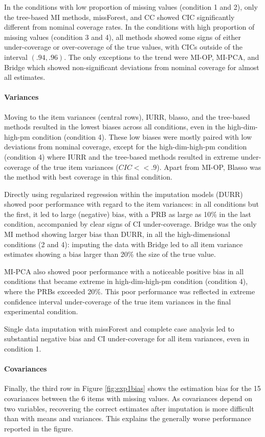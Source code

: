 \documentclass[]{./cls/interact}
\theoremstyle{plain}
\theoremstyle{definition}
\theoremstyle{remark}
\begin{document}
	In the conditions with low proportion of missing values (condition 1 and 2), only the tree-based MI methods,
	missForest, and CC showed CIC significantly different from nominal coverage rates.
	In the conditions with high proportion of missing values (condition 3 and 4), all methods showed some signs 
	of either under-coverage or over-coverage of the true values, with CICs outside of the interval $(.94, .96)$.
	The only exceptions to the trend were MI-OP, MI-PCA, and Bridge which showed non-significant deviations from 
	nominal coverage for almost all estimates.

	\paragraph{Variances} 
	Moving to the item variances (central rows), IURR, blasso, and the tree-based methods resulted in the lowest
	biases across all conditions, even in the high-dim-high-pm condition (condition 4).
	These low biases were mostly paired with low deviations from nominal coverage, except for the high-dim-high-pm
	condition (condition 4) where IURR and the tree-based methods resulted in extreme under-coverage of the true item 
	variances ($CIC << .9$).
	Apart from MI-OP, Blasso was the method with best coverage in this final condition.
	
	Directly using regularized regression within the imputation models (DURR) showed poor performance with regard 
	to the item variances: in all conditions but the first, it led to large (negative) bias, with a PRB as large as 10\% in 
	the last condition, accompanied by clear signs of CI under-coverage.
	Bridge was the only MI method showing larger bias than DURR, in all the high-dimensional conditions (2 and 4):
	imputing the data with Bridge led to all item variance estimates showing a bias larger than 20\% the size of the
	true value.

	MI-PCA also showed poor performance with a noticeable positive bias in all conditions that became extreme in
	high-dim-high-pm condition (condition 4), where the PRBs exceeded 20\%.
	This poor performance was reflected in extreme confidence interval under-coverage of the true item variances in
	the final experimental condition.

	Single data imputation with missForest and complete case analysis led to substantial negative bias and 
	CI under-coverage for all item variances, even in condition 1.

	\paragraph{Covariances}
	Finally, the third row in Figure \ref{fig:exp1bias} shows the estimation bias for the 15 covariances between 
	the 6 items with missing values.
	As covariances depend on two variables, recovering the correct estimates after imputation is 
	more difficult than with means and variances.
	This explains the generally worse performance reported in the figure.
\end{document}
